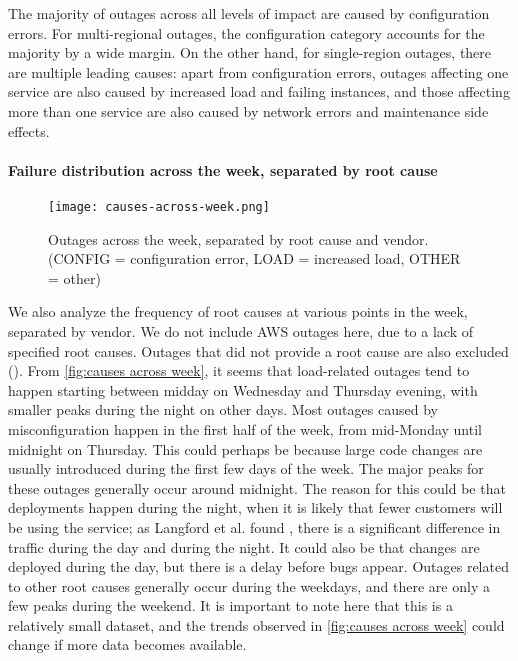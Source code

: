 The majority of outages across all levels of impact are caused by configuration errors.
For multi-regional outages, the configuration category accounts for the majority by a wide margin.
On the other hand, for single-region outages, there are multiple leading causes: apart from configuration errors, outages affecting one service are also caused by increased load and failing instances, and those affecting more than one service are also caused by network errors and maintenance side effects.

\paragraph{Failure distribution across the week, separated by root cause}
\begin{figure}
  \centering
  \texttt{[image: causes-across-week.png]}
  \caption{Outages across the week, separated by root cause and vendor. (CONFIG = configuration error, LOAD = increased load, OTHER = other)}
  \label{fig:causes across week}
\end{figure}

We also analyze the frequency of root causes at various points in the week, separated by vendor.
We do not include AWS outages here, due to a lack of specified root causes.
Outages that did not provide a root cause are also excluded ().
From \autoref{fig:causes across week}, it seems that load-related outages tend to happen starting between midday on Wednesday and Thursday evening, with smaller peaks during the night on other days.
Most outages caused by misconfiguration happen in the first half of the week, from mid-Monday until midnight on Thursday.
This could perhaps be because large code changes are usually introduced during the first few days of the week. %
The major peaks for these outages generally occur around midnight.
The reason for this could be that deployments happen during the night, when it is likely that fewer customers will be using the service; as Langford et al. found \cite{langford2012}, there is a significant difference in traffic during the day and during the night.
It could also be that changes are deployed during the day, but there is a delay before bugs appear.
Outages related to other root causes generally occur during the weekdays, and there are only a few peaks during the weekend.
It is important to note here that this is a relatively small dataset, and the trends observed in \autoref{fig:causes across week} could change if more data becomes available.

